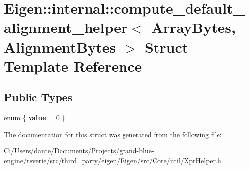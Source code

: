 \hypertarget{struct_eigen_1_1internal_1_1compute__default__alignment__helper}{}\section{Eigen\+::internal\+::compute\+\_\+default\+\_\+alignment\+\_\+helper$<$ Array\+Bytes, Alignment\+Bytes $>$ Struct Template Reference}
\label{struct_eigen_1_1internal_1_1compute__default__alignment__helper}
\subsection*{Public Types}
\begin{DoxyCompactItemize}
\item 
\mbox{\label{struct_eigen_1_1internal_1_1compute__default__alignment__helper_aab29b4521999f9f51abc2438c5f7cdeb}} 
enum \{ {\bfseries value} = 0
 \}
\end{DoxyCompactItemize}


The documentation for this struct was generated from the following file\+:\begin{DoxyCompactItemize}
\item 
C\+:/\+Users/dante/\+Documents/\+Projects/grand-\/blue-\/engine/reverie/src/third\+\_\+party/eigen/\+Eigen/src/\+Core/util/Xpr\+Helper.\+h\end{DoxyCompactItemize}
